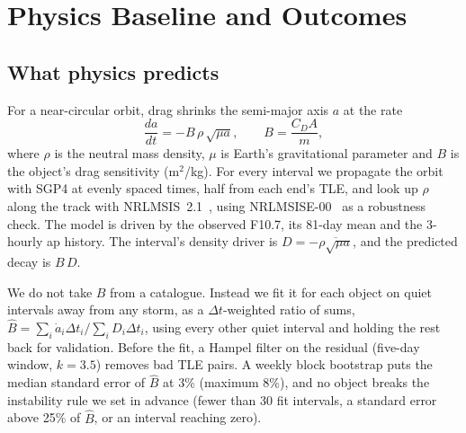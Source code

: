 \section{Physics Baseline and Outcomes}
\label{sec:physics}

\subsection{What physics predicts}
For a
near-circular orbit, drag shrinks the semi-major axis $a$ at the rate
\begin{equation}
\frac{da}{dt} = -B\,\rho\,\sqrt{\mu a}, \qquad B = \frac{C_D A}{m},
\label{eq:drag}
\end{equation}
where $\rho$ is the neutral mass density, $\mu$ is Earth's gravitational parameter and $B$ is
the object's drag sensitivity (m$^2$/kg). For every interval we propagate the orbit with SGP4 at
evenly spaced times, half from each end's TLE, and look up $\rho$ along the track with
NRLMSIS~2.1~\cite{emmert2022msis21}, using NRLMSISE-00~\cite{picone2002nrlmsise} as a robustness
check. The model is driven by the observed F10.7, its 81-day mean and the 3-hourly ap history.
The interval's density driver is $D = -\overline{\rho\sqrt{\mu a}}$, and the predicted decay is
$B\,D$.

We do not take $B$ from a catalogue. Instead we fit it for each object on quiet intervals away
from any storm, as a $\Delta t$-weighted ratio of sums,
$\hat B = \sum_i \dot a_i \Delta t_i / \sum_i D_i \Delta t_i$, using every other quiet interval
and holding the rest back for validation. Before the fit, a Hampel filter on the residual
(five-day window, $k=3.5$) removes bad TLE pairs. A weekly block bootstrap puts the median
standard error of $\hat B$ at 3\% (maximum 8\%), and no object breaks the instability rule we
set in advance (fewer than 30 fit intervals, a standard error above 25\% of $\hat B$, or an
interval reaching zero).

